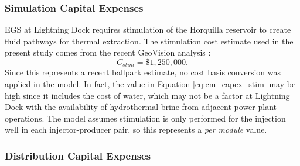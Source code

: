\subsubsection{Simulation Capital Expenses}\label{ch4:cm_stim}

EGS at Lightning Dock requires stimulation of the Horquilla reservoir to create fluid pathways for thermal extraction. The stimulation cost estimate used in the present study comes from the recent GeoVision analysis \citep{lowry_geovision_2017}:
\begin{equation}
\label{eq:cm_capex_stim}
    C_{stim} = \$1,250,000.
\end{equation}
Since this represents a recent ballpark estimate, no cost basis conversion was applied in the model. In fact, the value in Equation \ref{eq:cm_capex_stim} may be high since it includes the cost of water, which may not be a factor at Lightning Dock with the availability of hydrothermal brine from adjacent power-plant operations. The model assumes stimulation is only performed for the injection well in each injector-producer pair, so this represents a \textit{per module} value.

\subsubsection{Distribution Capital Expenses}\label{ch4:cm_capex_dist}

